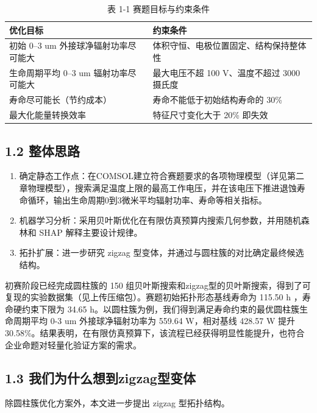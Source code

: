 \documentclass[
  a4paper,
]{ctexart}
\providecommand{\tightlist}{%
  \setlength{\itemsep}{0pt}\setlength{\parskip}{0pt}}
\begin{document}
\begin{table}[H]
\centering
\caption*{表 1-1 赛题目标与约束条件}
\small
\begin{tabularx}{\textwidth}{YY}
\toprule
优化目标 & 约束条件 \\
\midrule
初始 0--3 um 外接球净辐射功率尽可能大 & 体积守恒、电极位置固定、结构保持整体性 \\
生命周期平均 0--3 um 辐射功率尽可能大 & 最大电压不超 100 V、温度不超过 3000 摄氏度 \\
寿命尽可能长（节约成本） & 寿命不能低于初始结构寿命的 30\% \\
最大化能量转换效率 & 特征尺寸变化大于 20\% 即失效 \\
\bottomrule
\end{tabularx}
\end{table}


\subsection{1.2 整体思路}\label{ux6574ux4f53ux601dux8def}

\begin{enumerate}
\def\labelenumi{\arabic{enumi}.}
\tightlist
\item
  确定静态工作点：在COMSOL建立符合赛题要求的各项物理模型（详见第二章物理模型），搜索满足温度上限的最高工作电压，并在该电压下推进退蚀寿命循环，输出生命周期0到3微米平均辐射功率、寿命等相关指标。
\item
  机器学习分析：采用贝叶斯优化在有限仿真预算内搜索几何参数，并用随机森林和
  SHAP 解释主要设计规律。
\item
  拓扑扩展：进一步研究 zigzag 型变体，并通过与圆柱簇的对比确定最终候选结构。
\end{enumerate}

初赛阶段已经完成圆柱簇的 150
组贝叶斯搜索和zigzag型的贝叶斯搜索，得到了可复现的实验数据集（见上传压缩包）。赛题初始拓扑形态基线寿命为
115.50 h ，寿命硬约束下限为 34.65
h。以圆柱簇为例，我们得到满足寿命约束的最优圆柱簇生命周期平均 0-3 um
外接球净辐射功率为 559.64 W，相对基线 428.57 W 提升
30.58\%。结果表明，在有限仿真预算下，该流程已经获得明显性能提升，也符合企业命题对轻量化验证方案的需求。

\subsection{1.3
我们为什么想到zigzag型变体}\label{ux6211ux4eecux4e3aux4ec0ux4e48ux60f3ux5230zigzagux578bux53d8ux4f53}

除圆柱簇优化方案外，本文进一步提出 zigzag 型拓扑结构。
\end{document}
